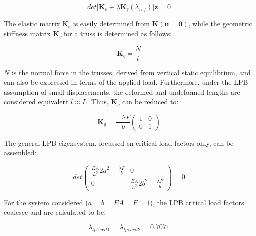  \begin{equation} 
det\big[
\mathbf{K}_e +
{\lambda}
\mathbf{K}_g(\lambda_{ref})
\big]\mathbf{z} = 0
\label{eqapp0_11}
\end{equation}

The elastic matrix $\mathbf{K}_e$ is easily determined from $\mathbf{K}(\mathbf{u} = \mathbf{0})$, while the geometric stiffness matrix $\mathbf{K}_g$ for a truss is determined as follows:

 \begin{equation} 
\mathbf{K}_g = 
\frac{N}{l}
\label{eqapp0_12}
\end{equation}

$N$ is the normal force in the trusses, derived from vertical static equilibrium, and can also be expressed in terms of the applied load. Furthermore, under the LPB assumption of small displacements, the deformed and undeformed lengths are considered equivalent $l \approx L$. Thus, $\mathbf{K}_g$ can be reduced to:

 \begin{equation} 
\mathbf{K}_g = 
\frac{-\lambda F}{b}
\begin{pmatrix}
1 & 0 \\
0 & 1
\end{pmatrix}
\label{eqapp0_13}
\end{equation}

The general LPB eigensystem, focussed on critical load factors only, can be assembled:

 \begin{equation} 
 det
\begin{pmatrix}
\frac{EA}{L^3} 2a^2 - \frac{\lambda F}{b} & 0 \\
0 &  \frac{EA}{L^3} 2b^2 - \frac{\lambda F}{b}
\end{pmatrix}
= 0
\label{eqapp0_14}
\end{equation}

For the system considered ($a=b=EA=F=1$), the LPB critical load factors coalesce and are calculated to be:

\begin{equation} 
\lambda_{lpb\ crit1} = 
\lambda_{lpb\ crit2} = 0.7071
\label{eqapp0_15}
\end{equation}